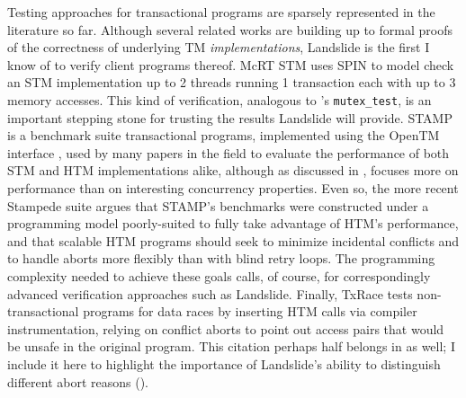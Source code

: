 Testing approaches for transactional programs are sparsely represented in the literature so far.
Although several related works \cite{tm-correctness,tm-completeness,specifying-verifying-tm}
are building up to formal proofs of the correctness of underlying TM {\em implementations},
Landslide is the first I know of to verify client programs thereof.
McRT STM \cite{mc-tm-with-spin} uses SPIN \cite{spin} to model check an STM implementation
up to 2 threads running 1 transaction each with up to 3 memory accesses.
This kind of verification,
analogous to \sect{\ref{sec:education-pebbles-tests}}'s {\tt mutex\_test},
is an important stepping stone for trusting the results Landslide will provide.
STAMP \cite{stamp} is a benchmark suite transactional programs,
implemented using the OpenTM interface \cite{opentm},
used by many papers in the field to evaluate the performance of both STM and HTM implementations alike,
although as discussed in \sect{\ref{sec:tm-eval-exp-setup}},
focuses more on performance than on interesting concurrency properties.
Even so, the more recent Stampede suite \cite{scalable-tm} argues that STAMP's benchmarks
were constructed under a programming model poorly-suited to fully take advantage of HTM's performance,
and that scalable HTM programs should
seek to minimize incidental conflicts and to handle aborts more flexibly than with blind retry loops.
The programming complexity needed to achieve these goals calls,
of course,
for correspondingly advanced verification approaches such as Landslide.
Finally, TxRace \cite{txrace}
tests non-transactional programs for data races
by inserting HTM calls via compiler instrumentation,
relying on conflict aborts to point out access pairs that would be unsafe in the original program.
This citation perhaps half belongs in \sect{\ref{sec:related-data-race}} as well;
I include it here to highlight the importance of Landslide's
ability to distinguish different abort reasons (\sect{\ref{sec:txn-abort-codes}}).

